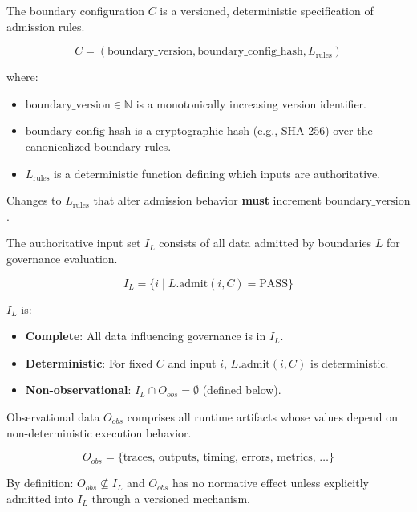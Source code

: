 \begin{definition}
The boundary configuration $C$ is a versioned, deterministic specification of admission rules. 

$$C = (\text{boundary\_version}, \text{boundary\_config\_hash}, L_{\text{rules}})$$

where:
\begin{itemize}
  \item $\text{boundary\_version} \in \mathbb{N}$ is a monotonically increasing version identifier.
  \item $\text{boundary\_config\_hash}$ is a cryptographic hash (e.g., SHA-256) over the canonicalized boundary rules.
  \item $L_{\text{rules}}$ is a deterministic function defining which inputs are authoritative.
\end{itemize}

Changes to $L_{\text{rules}}$ that alter admission behavior \textbf{must} increment $\text{boundary\_version}$.
\end{definition}

\begin{definition}
The authoritative input set $I_L$ consists of all data admitted by boundaries $L$ for governance evaluation.

$$I_L = \{i \mid L.\text{admit}(i, C) = \text{PASS}\}$$

$I_L$ is:
\begin{itemize}
  \item \textbf{Complete}: All data influencing governance is in $I_L$.
  \item \textbf{Deterministic}: For fixed $C$ and input $i$, $L.\text{admit}(i, C)$ is deterministic.
  \item \textbf{Non-observational}: $I_L \cap O_{obs} = \emptyset$ (defined below).
\end{itemize}
\end{definition}

\begin{definition}
Observational data $O_{obs}$ comprises all runtime artifacts whose values depend on non-deterministic execution behavior.

$$O_{obs} = \{\text{traces, outputs, timing, errors, metrics, \ldots}\}$$

By definition: $O_{obs} \not\subseteq I_L$ and $O_{obs}$ has no normative effect unless explicitly admitted into $I_L$ through a versioned mechanism.
\end{definition}

